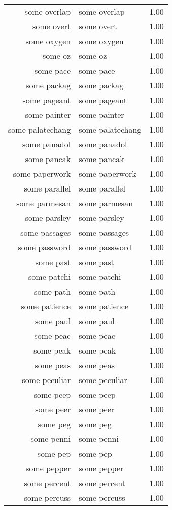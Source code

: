 \begin{table}[ht]
\begin{tabular}{rlr}
  some overlap & some overlap & 1.00 \\ 
  some overt & some overt & 1.00 \\ 
  some oxygen & some oxygen & 1.00 \\ 
  some oz & some oz & 1.00 \\ 
  some pace & some pace & 1.00 \\ 
  some packag & some packag & 1.00 \\ 
  some pageant & some pageant & 1.00 \\ 
  some painter & some painter & 1.00 \\ 
  some palatechang & some palatechang & 1.00 \\ 
  some panadol & some panadol & 1.00 \\ 
  some pancak & some pancak & 1.00 \\ 
  some paperwork & some paperwork & 1.00 \\ 
  some parallel & some parallel & 1.00 \\ 
  some parmesan & some parmesan & 1.00 \\ 
  some parsley & some parsley & 1.00 \\ 
  some passages & some passages & 1.00 \\ 
  some password & some password & 1.00 \\ 
  some past & some past & 1.00 \\ 
  some patchi & some patchi & 1.00 \\ 
  some path & some path & 1.00 \\ 
  some patience & some patience & 1.00 \\ 
  some paul & some paul & 1.00 \\ 
  some peac & some peac & 1.00 \\ 
  some peak & some peak & 1.00 \\ 
  some peas & some peas & 1.00 \\ 
  some peculiar & some peculiar & 1.00 \\ 
  some peep & some peep & 1.00 \\ 
  some peer & some peer & 1.00 \\ 
  some peg & some peg & 1.00 \\ 
  some penni & some penni & 1.00 \\ 
  some pep & some pep & 1.00 \\ 
  some pepper & some pepper & 1.00 \\ 
  some percent & some percent & 1.00 \\ 
  some percuss & some percuss & 1.00 \\ 

\end{tabular}
\end{table}

